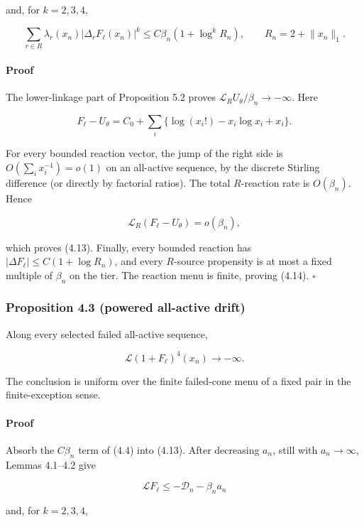 and, for \(k=2,3,4\),

\[
 \sum_{r\in R}\lambda_r(x_n)|\Delta_rF_\ell(x_n)|^k
 \le C\beta_n(1+\log^k R_n),
 \qquad R_n=2+\lVert x_n\rVert_1.                  \tag{4.14}
\]

\paragraph{Proof}

The lower-linkage part of Proposition 5.2 proves
\(\mathcal L_RU_\theta/\beta_n\to-\infty\). Here

\[
 F_\ell-U_\theta
 =C_0+\sum_i\{\log(x_i!)-x_i\log x_i+x_i\}.        \tag{4.15}
\]

For every bounded reaction vector, the jump of the right side is
\(O(\sum_i x_i^{-1})=o(1)\) on an all-active sequence, by the discrete
Stirling difference (or directly by factorial ratios). The total
\(R\)-reaction rate is \(O(\beta_n)\). Hence

\[
 \mathcal L_R(F_\ell-U_\theta)=o(\beta_n),          \tag{4.16}
\]

which proves (4.13). Finally, every bounded reaction has
\(|\Delta F_\ell|\le C(1+\log R_n)\), and every \(R\)-source propensity
is at most a fixed multiple of \(\beta_n\) on the tier. The reaction
menu is finite, proving (4.14). \(\square\)

\subsubsection{Proposition 4.3 (powered all-active
drift)}

Along every selected failed all-active sequence,

\[
 \mathcal L(1+F_\ell)^4(x_n)\longrightarrow-\infty. \tag{4.17}
\]

The conclusion is uniform over the finite failed-cone menu of a fixed
pair in the finite-exception sense.

\paragraph{Proof}

Absorb the \(C\beta_n\) term of (4.4) into (4.13). After decreasing
\(a_n\), still with \(a_n\to\infty\), Lemmas 4.1--4.2 give

\[
 \mathcal LF_\ell
 \le-\mathcal D_n-\beta_na_n                         \tag{4.18}
\]

and, for \(k=2,3,4\),

